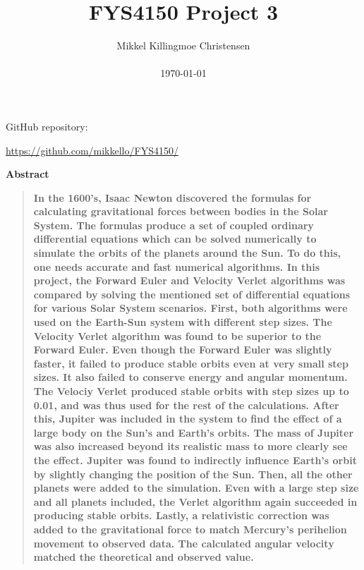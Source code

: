 \documentclass[10pt,a4paper,titlepage]{article}
\title{FYS4150 Project 3}
\author
{Mikkel Killingmoe Christensen\\
\\
\normalsize{\today}
}
\date{}
\newenvironment{sciabstract}{%
\begin{quote} \bf}
{\end{quote}}
\begin{document}
 




\maketitle 
\begin{center}
\par GitHub repository:
\par \url{https://github.com/mikkello/FYS4150/}
\end{center}



\begin{center}
{\large \textbf{Abstract}}
\end{center}
\begin{sciabstract}
In the 1600's, Isaac Newton discovered the formulas for calculating gravitational forces between bodies in the Solar System. The formulas produce a set of coupled ordinary differential equations which can be solved numerically to simulate the orbits of the planets around the Sun. To do this, one needs accurate and fast numerical algorithms. In this project, the Forward Euler and Velocity Verlet algorithms was compared by solving the mentioned set of differential equations for various Solar System scenarios. First, both algorithms were used on the Earth-Sun system with different step sizes. The Velocity Verlet algorithm was found to be superior to the Forward Euler. Even though the Forward Euler was slightly faster, it failed to produce stable orbits even at very small step sizes. It also failed to conserve energy and angular momentum. The Velociy Verlet produced stable orbits with step sizes up to 0.01, and was thus used for the rest of the calculations.  After this, Jupiter was included in the system to find the effect of a large body on the Sun's and Earth's orbits. The mass of Jupiter was also increased beyond its realistic mass to more clearly see the effect. Jupiter was found to indirectly influence Earth's orbit by slightly changing the position of the Sun. Then, all the other planets were added to the simulation. Even with a large step size and all planets included, the Verlet algorithm again succeeded in producing stable orbits. Lastly, a relativistic correction was added to the gravitational force to match Mercury's perihelion movement to observed data. The calculated angular velocity matched the theoretical and observed value. 
\end{sciabstract}
\end{document}
